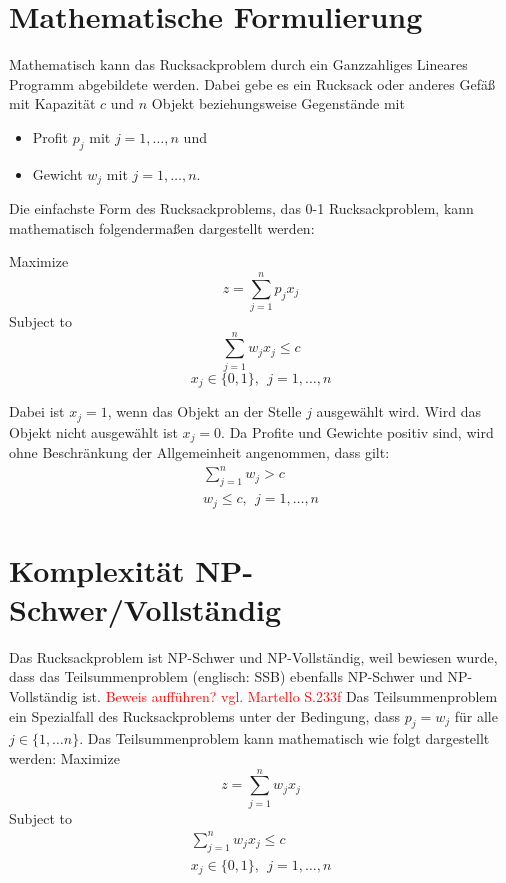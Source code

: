\section{Mathematische Formulierung}
Mathematisch kann das Rucksackproblem durch ein Ganzzahliges Lineares Programm abgebildete werden. Dabei gebe es ein Rucksack oder anderes Gefäß mit Kapazität $c$ und $n$ Objekt beziehungsweise Gegenstände mit
\begin{itemize}
    \item Profit $p_j$ mit $j=1,\ldots,n$ und
    \item Gewicht $w_j$ mit $j=1,\ldots,n$.
\end{itemize}
Die einfachste Form des Rucksackproblems, das 0-1 Rucksackproblem, kann mathematisch folgendermaßen dargestellt werden: \cite[vgl.][]{Martello1987}

Maximize
\begin{equation}
z=\sum_{j=1}^{n}{p_jx_j} 
\end{equation}
Subject to 
\begin{equation} \label{eqn:subjectTo}
\sum_{j=1}^{n}{w_jx_j\le c}
\end{equation}
\begin{equation} \label{eqn:bedingung}
x_j\in\{0,1\},\ \ j=1,\ldots,n
\end{equation}

Dabei ist $x_j = 1$, wenn das Objekt an der Stelle $j$ ausgewählt wird. Wird das Objekt nicht ausgewählt ist $x_j = 0$. Da Profite und Gewichte positiv sind, wird ohne Beschränkung der Allgemeinheit angenommen, dass gilt: \cite[vgl.][]{Martello1987}
\begin{eqnarray}
\sum_{j=1}^{n}{w_j>c} \\
w_j\le c,\ \ j=1,\ldots,n
\end{eqnarray}


\section{Komplexität NP-Schwer/Vollständig}
Das Rucksackproblem ist NP-Schwer und NP-Vollständig, weil bewiesen wurde, dass das Teilsummenproblem (englisch: \ac{SSB}) ebenfalls NP-Schwer und NP-Vollständig ist. \textcolor{red}{Beweis aufführen? vgl. Martello S.233f} Das Teilsummenproblem ein Spezialfall des Rucksackproblems unter der Bedingung, dass $p_j=w_j$ für alle $j \in \{1, \dots n\}$. Das Teilsummenproblem kann mathematisch wie folgt dargestellt werden: \cite[vgl.][]{Martello1987}
\newpage
Maximize
\begin{equation}
z=\sum_{j=1}^{n}{w_jx_j} 
\end{equation}
Subject to 
\begin{eqnarray}
\sum_{j=1}^{n}{w_jx_j\le c}\\
x_j\in\{0,1\},\ \ j=1,\ldots,n
\end{eqnarray}


